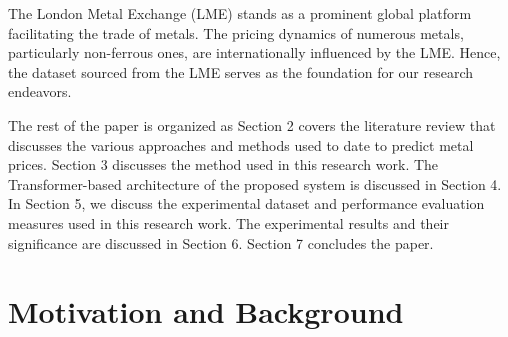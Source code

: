 \documentclass{ws-ijait}
\begin{document}
\par The London Metal Exchange (LME) stands as a prominent global platform facilitating the trade of metals. The pricing dynamics of numerous metals, particularly non-ferrous ones, are internationally influenced by the LME. Hence, the dataset sourced from the LME serves as the foundation for our research endeavors.
\par The rest of the paper is organized as Section 2 covers the literature review that discusses the various approaches and methods used to date to predict metal prices. Section 3 discusses the method used in this research work. The Transformer-based architecture of the proposed system is discussed in Section 4. In Section 5, we discuss the experimental dataset and performance evaluation measures used in this research work. The experimental results and their significance are discussed in Section 6. Section 7 concludes the paper.

\section{Motivation and Background}
\end{document}
